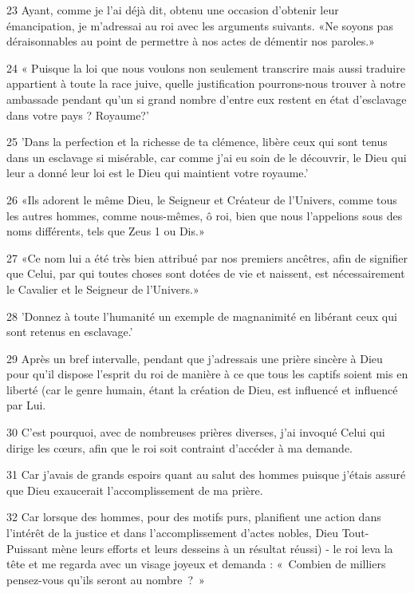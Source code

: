\par 23 Ayant, comme je l'ai déjà dit, obtenu une occasion d'obtenir leur émancipation, je m'adressai au roi avec les arguments suivants. «Ne soyons pas déraisonnables au point de permettre à nos actes de démentir nos paroles.»

\par 24 « Puisque la loi que nous voulons non seulement transcrire mais aussi traduire appartient à toute la race juive, quelle justification pourrons-nous trouver à notre ambassade pendant qu'un si grand nombre d'entre eux restent en état d'esclavage dans votre pays ? Royaume?'

\par 25 'Dans la perfection et la richesse de ta clémence, libère ceux qui sont tenus dans un esclavage si misérable, car comme j'ai eu soin de le découvrir, le Dieu qui leur a donné leur loi est le Dieu qui maintient votre royaume.'

\par 26 «Ils adorent le même Dieu, le Seigneur et Créateur de l'Univers, comme tous les autres hommes, comme nous-mêmes, ô roi, bien que nous l'appelions sous des noms différents, tels que Zeus 1 ou Dis.»

\par 27 «Ce nom lui a été très bien attribué par nos premiers ancêtres, afin de signifier que Celui, par qui toutes choses sont dotées de vie et naissent, est nécessairement le Cavalier et le Seigneur de l'Univers.»

\par 28 'Donnez à toute l'humanité un exemple de magnanimité en libérant ceux qui sont retenus en esclavage.'

\par 29 Après un bref intervalle, pendant que j'adressais une prière sincère à Dieu pour qu'il dispose l'esprit du roi de manière à ce que tous les captifs soient mis en liberté (car le genre humain, étant la création de Dieu, est influencé et influencé par Lui.

\par 30 C'est pourquoi, avec de nombreuses prières diverses, j'ai invoqué Celui qui dirige les cœurs, afin que le roi soit contraint d'accéder à ma demande.

\par 31 Car j'avais de grands espoirs quant au salut des hommes puisque j'étais assuré que Dieu exaucerait l'accomplissement de ma prière.

\par 32 Car lorsque des hommes, pour des motifs purs, planifient une action dans l'intérêt de la justice et dans l'accomplissement d'actes nobles, Dieu Tout-Puissant mène leurs efforts et leurs desseins à un résultat réussi) - le roi leva la tête et me regarda avec un visage joyeux et demanda : « Combien de milliers pensez-vous qu'ils seront au nombre ? »

